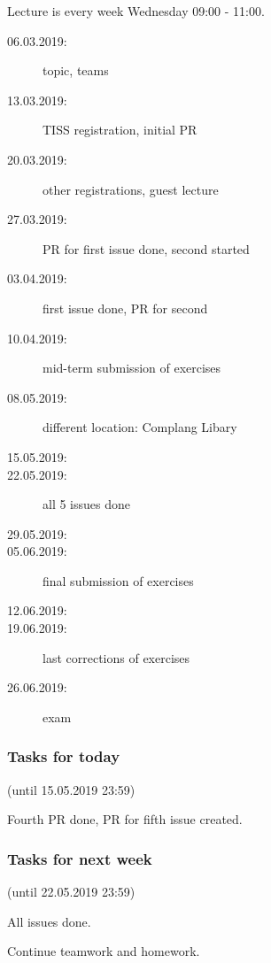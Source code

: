 

\date{15.05.2019}



\renewcommand{\enquote}[1]{\emph{``#1''}} %

\begin{frame}
	\titlepage
	\doclicenseThis
\end{frame}


\begin{frame}
	Lecture is every week Wednesday 09:00 - 11:00.

	\begin{description}
		\item[06.03.2019:] {\color{gray}topic, teams}
		\item[13.03.2019:] {\color{gray}TISS registration, initial PR}
		\item[20.03.2019:] {\color{gray}other registrations, guest lecture}
		\item[27.03.2019:] {\color{gray}PR for first issue done, second started}
		\item[03.04.2019:] {\color{gray}first issue done, PR for second}
		\item[10.04.2019:] {\color{gray}mid-term submission of exercises}
		\item[08.05.2019:] {\color{gray}different location: Complang Libary}
		\item[15.05.2019:]
		\item[22.05.2019:] all 5 issues done
		\item[29.05.2019:]
		\item[05.06.2019:] final submission of exercises
		\item[12.06.2019:]
		\item[19.06.2019:] last corrections of exercises
		\item[26.06.2019:] exam
	\end{description}
\end{frame}

\begin{assignment}
	\frametitle{Tasks for today}
	(until 15.05.2019 23:59)

	\begin{task}
	Fourth PR done, PR for fifth issue created.
	\end{task}
\end{assignment}

\begin{assignment}
	\frametitle{Tasks for next week}
	(until 22.05.2019 23:59)

	\begin{task}
	All issues done.
	\end{task}

	\begin{task}
	Continue teamwork and homework.
	\end{task}
\end{assignment}

